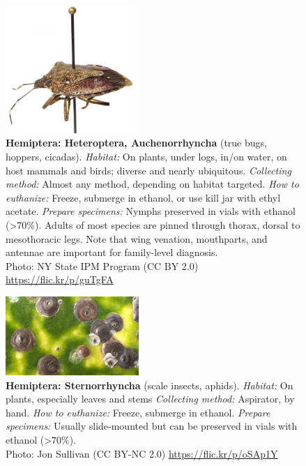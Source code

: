 \documentclass[letterpaper, 11pt]{article}
\begin{document}
\begin{figure}
  \caption{\textbf{Hemiptera: Heteroptera, Auchenorrhyncha} (true bugs, hoppers, cicadas). \textit{Habitat:} On plants, under logs, in/on water, on host mammals and birds; diverse and nearly ubiquitous. \textit{Collecting method:} Almost any method, depending on habitat targeted. \textit{How to euthanize:} Freeze, submerge in ethanol, or use kill jar with ethyl acetate. \textit{Prepare specimens:} Nymphs preserved in vials with ethanol (\textgreater70\%). Adults of most species are pinned through thorax, dorsal to mesothoracic legs. Note that wing venation, mouthparts, and antennae are important for family-level diagnosis.\\ Photo: NY State IPM Program (CC BY 2.0) \url{https://flic.kr/p/guTgFA}}
  \includegraphics[width=0.45\textwidth]{HemipteraHeteroptera}
\end{figure}

\clearpage

\begin{figure}
  \caption{\textbf{Hemiptera: Sternorrhyncha} (scale insects, aphids). \textit{Habitat:} On plants, especially leaves and stems \textit{Collecting method:} Aspirator, by hand. \textit{How to euthanize:} Freeze, submerge in ethanol. \textit{Prepare specimens:} Usually slide-mounted but can be preserved in vials with ethanol (\textgreater70\%).\\ Photo: Jon Sullivan (CC BY-NC 2.0) \url{https://flic.kr/p/oSAp1Y}}
  \includegraphics[width=0.45\textwidth]{HemipteraSternorrhyncha}
\end{figure}
\end{document}
